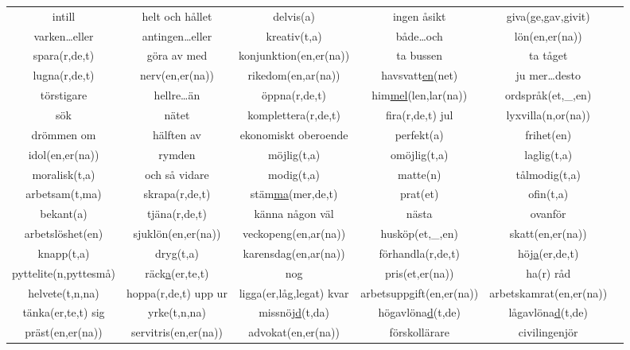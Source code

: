 \begin{center}
    \begin{adjustwidth}{-2.5cm}{}
        \begin{tabular}{|c c c c c c|}
            \hline
            intill & helt och hållet & delvis(a) & ingen åsikt & giva(ge,gav,givit) &  \\
            varken\ldots eller & antingen\ldots eller & kreativ(t,a) & både\ldots och & lön(en,er(na)) &  \\
            spara(r,de,t) & göra av med & konjunktion(en,er(na)) & ta bussen & ta tåget &  \\
            lugna(r,de,t) & nerv(en,er(na)) & rikedom(en,ar(na)) & havsvatt\underline{en}(net) & ju mer\ldots desto &  \\
            törstigare & hellre\ldots än & öppna(r,de,t) & him\underline{mel}(len,lar(na)) & ordspråk(et,\_,en) &  \\
            sök & nätet & komplettera(r,de,t) & fira(r,de,t) jul & lyxvilla(n,or(na)) &  \\
            drömmen om & hälften av & ekonomiskt oberoende & perfekt(a) & frihet(en) &  \\
            idol(en,er(na)) & rymden & möjlig(t,a) & omöjlig(t,a) & laglig(t,a) &  \\
            moralisk(t,a) & och så vidare & modig(t,a) & matte(n) & tålmodig(t,a) &  \\
            arbetsam(t,ma) & skrapa(r,de,t) & stäm\underline{ma}(mer,de,t) & prat(et) & ofin(t,a) &  \\
            bekant(a) & tjäna(r,de,t) & känna någon väl & nästa & ovanför &  \\
            arbetslöshet(en) & sjuklön(en,er(na)) & veckopeng(en,ar(na)) & husköp(et,\_,en) & skatt(en,er(na)) &  \\
            knapp(t,a) & dryg(t,a) & karensdag(en,ar(na)) & förhandla(r,de,t) & höj\underline{a}(er,de,t) &  \\
            pyttelite(n,pyttesmå) & räck\underline{a}(er,te,t) & nog & pris(et,er(na)) & ha(r) råd &  \\
            helvete(t,n,na) & hoppa(r,de,t) upp ur & ligga(er,låg,legat) kvar & arbetsuppgift(en,er(na)) & arbetskamrat(en,er(na)) &  \\
            tänka(er,te,t) sig & yrke(t,n,na) & missnöj\underline{d}(t,da) & högavlöna\underline{d}(t,de) & lågavlöna\underline{d}(t,de) &  \\
            präst(en,er(na)) & servitris(en,er(na)) & advokat(en,er(na)) & förskollärare & civilingenjör &  \\

\end{tabular}
\end{adjustwidth}
\end{center}
